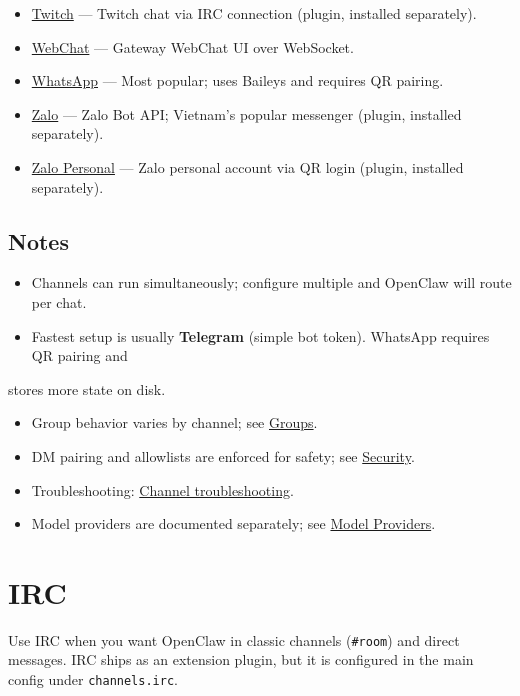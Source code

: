 \begin{itemize}
  \item \href{/channels/twitch}{Twitch} — Twitch chat via IRC connection (plugin, installed separately).
  \item \href{/web/webchat}{WebChat} — Gateway WebChat UI over WebSocket.
  \item \href{/channels/whatsapp}{WhatsApp} — Most popular; uses Baileys and requires QR pairing.
  \item \href{/channels/zalo}{Zalo} — Zalo Bot API; Vietnam's popular messenger (plugin, installed separately).
  \item \href{/channels/zalouser}{Zalo Personal} — Zalo personal account via QR login (plugin, installed separately).
\end{itemize}


\subsection{Notes}


\begin{itemize}
  \item Channels can run simultaneously; configure multiple and OpenClaw will route per chat.
  \item Fastest setup is usually \textbf{Telegram} (simple bot token). WhatsApp requires QR pairing and
\end{itemize}

stores more state on disk.
\begin{itemize}
  \item Group behavior varies by channel; see \href{/channels/groups}{Groups}.
  \item DM pairing and allowlists are enforced for safety; see \href{/gateway/security}{Security}.
  \item Troubleshooting: \href{/channels/troubleshooting}{Channel troubleshooting}.
  \item Model providers are documented separately; see \href{/providers/models}{Model Providers}.
\end{itemize}



\clearpage

\section{IRC}

Use IRC when you want OpenClaw in classic channels (\texttt{\#room}) and direct messages.
IRC ships as an extension plugin, but it is configured in the main config under \texttt{channels.irc}.

